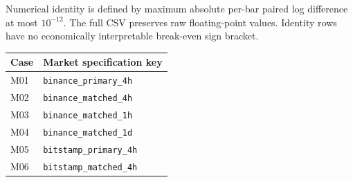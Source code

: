 \noindent Numerical identity is defined by maximum absolute per-bar paired log difference at most $10^{-12}$. The full CSV preserves raw floating-point values. Identity rows have no economically interpretable break-even sign bracket.
\begin{longtable}{lp{}}\toprule Case & Market specification key\\\midrule
M01 & \texttt{binance\_primary\_4h}\\
M02 & \texttt{binance\_matched\_4h}\\
M03 & \texttt{binance\_matched\_1h}\\
M04 & \texttt{binance\_matched\_1d}\\
M05 & \texttt{bitstamp\_primary\_4h}\\
M06 & \texttt{bitstamp\_matched\_4h}\\
\bottomrule\end{longtable}
